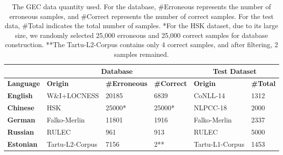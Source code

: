 \begin{table*}
\centering
\small
\begin{tabular}{l|lll|ll}
\hline
 & \multicolumn{3}{c|}{\textbf{Database}} & \multicolumn{2}{c}{\textbf{Test Dataset}} \\ \hline
\textbf{Language} & \textbf{Origin} & \textbf{\#Erroneous} & \textbf{\#Correct} & \textbf{Origin} & \textbf{\#Total} \\ \hline
\textbf{English} & W\&I+LOCNESS & 20185 & 6839 & CoNLL-14 & 1312 \\
\textbf{Chinese} & HSK & 25000* & 25000* & NLPCC-18 & 2000 \\
\textbf{German} & Falko-Merlin & 11801 & 1916 & Falko-Merlin & 2337 \\
\textbf{Russian} & RULEC & 961 & 913 & RULEC & 5000 \\
\textbf{Estonian} & Tartu-L2-Corpus & 7156 & 2** & Tartu-L1-Corpus & 1453 \\ \hline
\end{tabular}
\caption{
The GEC data quantity used. For the database, \#Erroneous represents the number of erroneous samples, and \#Correct represents the number of correct samples. For the test data, \#Total indicates the total number of samples. *For the HSK dataset, due to its large size, we randomly selected 25,000 erroneous and 25,000 correct samples for database construction. **The Tartu-L2-Corpus contains only 4 correct samples, and after filtering, 2 samples remained.
}
\label{tab:statistics}
\end{table*}